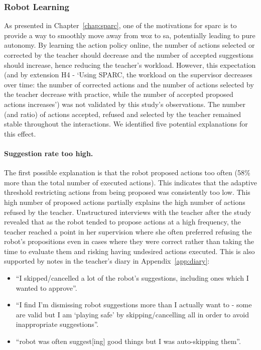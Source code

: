 \subsubsection{Robot Learning} \label{sec:tutoring_disc_learning}
%
%

As presented in Chapter~\ref{chap:sparc}, one of the motivations for \gls{sparc} is to provide a way to smoothly move away from \gls{woz} to \gls{sa}, potentially leading to pure autonomy. By learning the action policy online, the number of actions selected or corrected by the teacher should decrease and the number of accepted suggestions should increase, hence reducing the teacher's workload. However, this expectation (and by extension H4 - `Using SPARC, the workload on the supervisor decreases over time: the number of corrected actions and the number of actions selected by the teacher decrease with practice, while the number of accepted proposed actions increases') was not validated by this study's observations. The number (and ratio) of actions accepted, refused and selected by the teacher remained stable throughout the interactions. We identified five potential explanations for this effect.

\paragraph{Suggestion rate too high.} \label{sec:tuto_rate}
The first possible explanation is that the robot proposed actions too often (58\% more than the total number of executed actions). This indicates that the adaptive threshold restricting actions from being proposed was consistently too low. This high number of proposed actions partially explains the high number of actions refused by the teacher. Unstructured interviews with the teacher after the study revealed that as the robot tended to propose actions at a high frequency, the teacher reached a point in her supervision where she often preferred refusing the robot's propositions even in cases where they were correct rather than taking the time to evaluate them and risking having undesired actions executed. This is also supported by notes in the teacher's diary in Appendix~\ref{app:diary}:
\begin{itemize}
	\item ``I skipped/cancelled a lot of the robot’s suggestions, including ones which I wanted to approve''.
	\item ``I find I’m dismissing robot suggestions more than I actually want to - some are valid but I am `playing safe' by skipping/cancelling all in order to avoid inappropriate suggestions''.
	\item ``robot was often suggest[ing] good things but I was auto-skipping them''.
\end{itemize}

